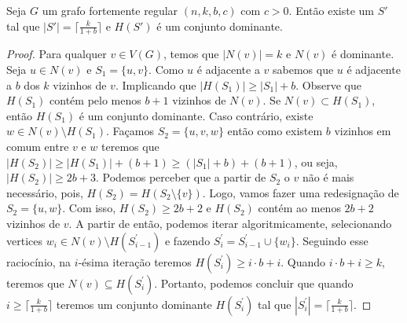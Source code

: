 \begin{theorem}
Seja $G$ um grafo fortemente regular $(n,k,b,c)$ com $c>0$. Então existe um $S'$ tal que $|S'| = \big\lceil \frac{k}{1+b} \big\rceil$ e $H(S')$ é um conjunto dominante.
\label{dom-gfr} 
\end{theorem}
\begin{proof}
 Para qualquer $v \in V(G)$, temos que $|N(v)|=k$ e $N(v)$ é dominante. Seja $u \in N(v)$ e $S_1=\{u,v\}$. Como $u$ é adjacente a $v$ sabemos que $u$ é adjacente a $b$ dos $k$ vizinhos de $v$. Implicando que $|H(S_1)| \ge |S_1| + b$. Observe que $H(S_1)$ contém pelo menos $b+1$ vizinhos de $N(v)$. Se $N(v)\subset H(S_1)$, então $H(S_1)$ é um conjunto dominante. Caso contrário, existe $w\in N(v) \setminus H(S_1)$. Façamos $S_2=\{u,v,w\}$ então como existem $b$ vizinhos em comum entre $v$ e $w$ teremos que $|H(S_2)| \geq |H(S_1)| + (b + 1) \ge (|S_1| + b) + (b + 1)$, ou seja, $|H(S_2)| \geq 2b + 3$. 
Podemos perceber que a partir de $S_2$ o $v$ não é mais necessário, pois, $H(S_2) = H(S_2\setminus \{v\})$. Logo, vamos fazer uma redesignação de $S_2=\{u,w\}$. Com isso, $H(S_2) \geq 2b + 2$ e $H(S_2)$ contém ao menos $2b+2$ vizinhos de $v$. 
A partir de então, podemos iterar algoritmicamente, selecionando vertices $w_i \in N(v) \setminus H(S^\prime_{i-1})$ e fazendo $S^\prime_i=S^\prime_{i-1}\cup \{w_i\}$. Seguindo esse raciocínio, na $i$-ésima iteração teremos $H(S^\prime_i) \geq i \cdot b + i$. Quando $i \cdot b + i\ge k$, teremos que $N(v)\subseteq H(S^\prime_i)$. Portanto, podemos concluir que quando $i \geq \big\lceil \frac{k}{1+b}\big\rceil$ teremos um conjunto dominante $H(S^\prime_i)$ tal que $|S^\prime_i| = \big\lceil \frac{k}{1+b}\big\rceil$.

\end{proof}


